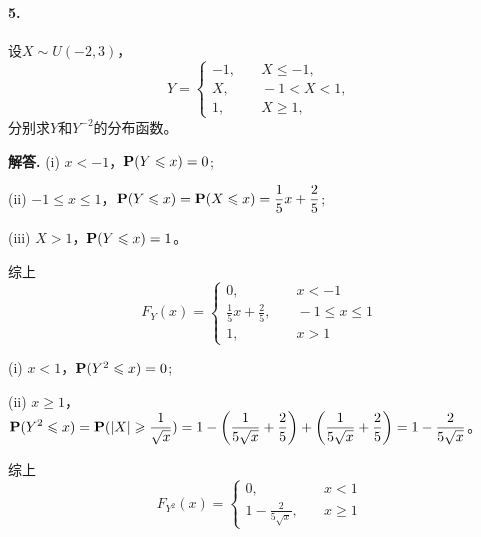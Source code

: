 \documentclass[12pt, a4paper, oneside]{ctexart}
\newenvironment{solution}{\par\noindent\textbf{解答. }}{\bigskip\par}
\begin{document}
\paragraph{5.}设$X\sim U(-2,3)$，\begin{equation*}
    Y = \begin{cases}
        -1,&\quad X\leqslant -1,\\
        X,&\quad -1<X<1,\\
        1,&\quad X \geqslant 1,
    \end{cases}
\end{equation*}
分别求$Y$和$Y^{-2}$的分布函数。
\begin{solution}
    (i) $x < -1$，$\P(Y\leqslant x) = 0$;

    (ii) $-1\leqslant x\leqslant 1$，$\disp\P(Y\leqslant x) = \P(X\leqslant x) = \frac{1}{5}x+\frac{2}{5}$;

    (iii) $X > 1$，$\P(Y\leqslant x) = 1$。

    综上
    \begin{equation*}
        F_Y(x) = \begin{cases}
            0,&\quad x < -1\\
            \frac{1}{5}x+\frac{2}{5},&\quad -1\leqslant x\leqslant 1\\
            1,&\quad x > 1
        \end{cases}
    \end{equation*}

    (i) $x<1$，$\P(Y^2\leqslant x) = 0$;

    (ii) $x\geqslant 1$，$\disp\P(Y^2\leqslant x) = \P(|X|\geqslant \frac{1}{\sqrt{x}}) = 1-\left(\frac{1}{5\sqrt{x}}+\frac{2}{5}\right)+\left(\-\frac{1}{5\sqrt{x}}+\frac{2}{5}\right) = 1-\frac{2}{5\sqrt{x}}$。

    综上
    \begin{equation*}
        F_{Y^2}(x) = \begin{cases}
            0,&\quad x < 1\\
            1-\frac{2}{5\sqrt{x}},&\quad x \geqslant 1
        \end{cases}
    \end{equation*}
\end{solution}
\end{document}
